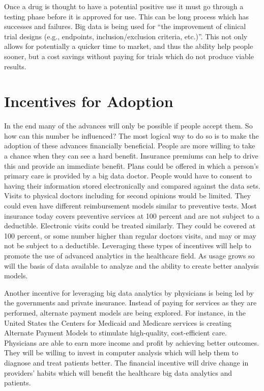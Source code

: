 \documentclass[sigconf]{acmart}
\begin{document}
Once a drug is thought to have a potential positive use it must go 
through a testing phase before it is approved for use.  This can be 
long process which has successes and failures.  Big data is being 
used for ``the improvement of clinical trial designs (e.g., endpoints, 
inclusion/exclusion criteria, etc.)''\cite{GeneticEpid}.  This not 
only allows for potentially a quicker time to market, and thus the 
ability help people sooner, but a cost savings without paying for 
trials which do not produce viable results.

\section{Incentives for Adoption}
In the end many of the advances will only be possible if people accept 
them.  So how can this number be influenced?  The most logical way to 
do so is to make the adoption of these advances financially 
beneficial.  People are more willing to take a chance when they can 
see a hard benefit.  Insurance premiums can help to drive this and 
provide an immediate benefit.  Plans could be offered in which a 
person's primary care is provided by a big data doctor.  People would 
have to consent to having their information stored electronically and 
compared against the data sets.  Visits to physical doctors including 
for second opinions would be limited.  They could even have different 
reimbursement models similar to preventive tests.  Most insurance 
today covers preventive services at 100 percent and are not subject 
to a deductible.  Electronic visits could be treated similarly.  They 
could be covered at 100 percent, or some number higher than regular 
doctors visits, and may or may not be subject to a deductible.  
Leveraging these types of incentives will help to promote the use of 
advanced analytics in the healthcare field.  As usage grows so will 
the basis of data available to analyze and the ability to create 
better analysis models.

Another incentive for leveraging big data analytics by physicians is 
being led by the governments and private insurance.  Instead of paying 
for services as they are performed, alternate payment models are 
being explored.  For instance, in the United States the Centers for 
Medicaid and Medicare services is creating Alternate Payment Models 
to stimulate high-quality, cost-efficient care\cite{CMSAPM}.  
Physicians are able to earn more income and profit by achieving 
better outcomes.  They will be willing to invest in computer analysis 
which will help them to diagnose and treat patients better.  The 
financial incentive will drive change in providers' habits which 
will benefit the healthcare big data analytics and patients.  
\end{document}
